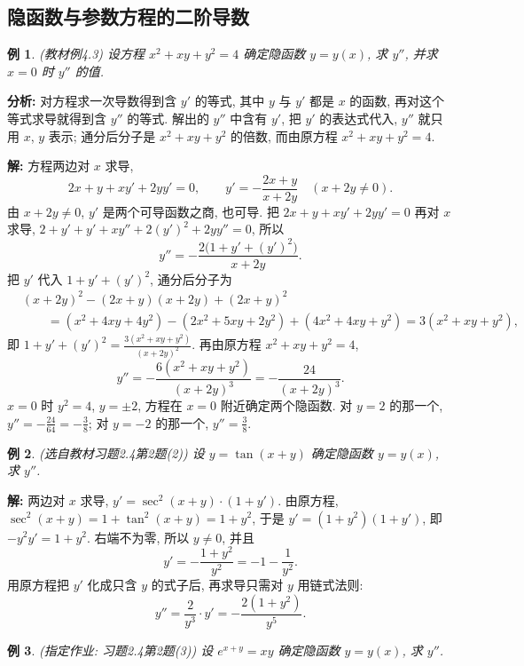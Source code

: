 \documentclass[UTF8,openany]{ctexbook}
\theoremstyle{chinesetextbook}
\newtheorem{example}{例}[section]
\newenvironment{cnsolution}{\par\indent\textbf{解:} \ignorespaces}{\par}
\begin{document}
\subsection{隐函数与参数方程的二阶导数}
\begin{example}\label{ex:c2-4-3}
\textnormal{(教材例4.3)} 设方程 $x^2+xy+y^2=4$ 确定隐函数 $y=y(x)$, 求 $y''$, 并求 $x=0$ 时 $y''$ 的值.
\end{example}
\par\indent\textbf{分析:} 对方程求一次导数得到含 $y'$ 的等式, 其中 $y$ 与 $y'$ 都是 $x$ 的函数, 再对这个等式求导就得到含 $y''$ 的等式. 解出的 $y''$ 中含有 $y'$, 把 $y'$ 的表达式代入, $y''$ 就只用 $x$, $y$ 表示; 通分后分子是 $x^2+xy+y^2$ 的倍数, 而由原方程 $x^2+xy+y^2=4$.
\begin{cnsolution}
方程两边对 $x$ 求导,
\[
2x+y+xy'+2yy'=0,\qquad y'=-\frac{2x+y}{x+2y}\quad(x+2y\ne0).
\]
由 $x+2y\ne0$, $y'$ 是两个可导函数之商, 也可导. 把 $2x+y+xy'+2yy'=0$ 再对 $x$ 求导, $2+y'+y'+xy''+2(y')^2+2yy''=0$, 所以
\[
y''=-\frac{2\bigl(1+y'+(y')^2\bigr)}{x+2y}.
\]
把 $y'$ 代入 $1+y'+(y')^2$, 通分后分子为
\[
\begin{aligned}
&(x+2y)^2-(2x+y)(x+2y)+(2x+y)^2\\
&\qquad=(x^2+4xy+4y^2)-(2x^2+5xy+2y^2)+(4x^2+4xy+y^2)=3(x^2+xy+y^2),
\end{aligned}
\]
即 $\displaystyle1+y'+(y')^2=\frac{3(x^2+xy+y^2)}{(x+2y)^2}$. 再由原方程 $x^2+xy+y^2=4$,
\[
y''=-\frac{6(x^2+xy+y^2)}{(x+2y)^3}=-\frac{24}{(x+2y)^3}.
\]
$x=0$ 时 $y^2=4$, $y=\pm2$, 方程在 $x=0$ 附近确定两个隐函数. 对 $y=2$ 的那一个, $\displaystyle y''=-\frac{24}{64}=-\frac38$; 对 $y=-2$ 的那一个, $\displaystyle y''=\frac38$.
\end{cnsolution}
\begin{example}\label{ex:c2-h4-2}
\textnormal{(选自教材习题2.4第2题(2))} 设 $y=\tan(x+y)$ 确定隐函数 $y=y(x)$, 求 $y''$.
\end{example}
\begin{cnsolution}
两边对 $x$ 求导, $y'=\sec^2(x+y)\cdot(1+y')$. 由原方程, $\sec^2(x+y)=1+\tan^2(x+y)=1+y^2$, 于是 $y'=(1+y^2)(1+y')$, 即 $-y^2y'=1+y^2$. 右端不为零, 所以 $y\ne0$, 并且
\[
y'=-\frac{1+y^2}{y^2}=-1-\frac1{y^2}.
\]
用原方程把 $y'$ 化成只含 $y$ 的式子后, 再求导只需对 $y$ 用链式法则:
\[
y''=\frac2{y^3}\cdot y'=-\frac{2(1+y^2)}{y^5}.
\]
\end{cnsolution}
\begin{example}\label{ex:c2-h4-2b}
\textnormal{(指定作业: 习题2.4第2题(3))} 设 $e^{x+y}=xy$ 确定隐函数 $y=y(x)$, 求 $y''$.
\end{example}
\end{document}
